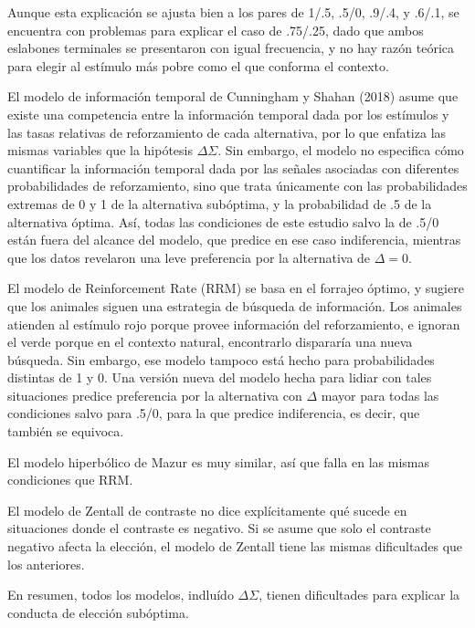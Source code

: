 \documentclass[a4paper,12pt]{article}
\begin{document}
Aunque esta explicación se ajusta bien a los pares de 1/.5, .5/0, .9/.4, y .6/.1, se encuentra con problemas para explicar el caso de .75/.25, dado que ambos eslabones terminales se presentaron con igual frecuencia, y no hay razón teórica para elegir al estímulo más pobre como el que conforma el contexto.

El modelo de información temporal de Cunningham y Shahan (2018) asume que existe una competencia entre la información temporal dada por los estímulos y las tasas relativas de reforzamiento de cada alternativa, por lo que enfatiza las mismas variables que la hipótesis $\Delta\Sigma$. Sin embargo, el modelo no especifica cómo cuantificar la información temporal dada por las señales asociadas con diferentes probabilidades de reforzamiento, sino que trata únicamente con las probabilidades extremas de 0 y 1 de la alternativa subóptima, y la probabilidad de .5 de la alternativa óptima. Así, todas las condiciones de este estudio salvo la de .5/0 están fuera del alcance del modelo, que predice en ese caso indiferencia, mientras que los datos revelaron una leve preferencia por la alternativa de $\Delta=0$.

El modelo de Reinforcement Rate (RRM) se basa en el forrajeo óptimo, y sugiere que los animales siguen una estrategia de búsqueda de información.  Los animales atienden al estímulo rojo porque provee información del reforzamiento, e ignoran el verde porque en el contexto natural, encontrarlo dispararía una nueva búsqueda. Sin embargo, ese modelo tampoco está hecho para probabilidades distintas de 1 y 0. Una versión nueva del modelo hecha para lidiar con tales situaciones predice preferencia por la alternativa con $\Delta$ mayor para todas las condiciones salvo para .5/0, para la que predice indiferencia, es decir, que también se equivoca.

El modelo hiperbólico de Mazur es muy similar, así que falla en las mismas condiciones que RRM.

El modelo de Zentall de contraste no dice explícitamente qué sucede en situaciones donde el contraste es negativo. Si se asume que solo el contraste negativo afecta la elección, el modelo de Zentall tiene las mismas dificultades que los anteriores.

En resumen, todos los modelos, indluído $\Delta\Sigma$, tienen dificultades para explicar la conducta de elección subóptima.
\end{document}
